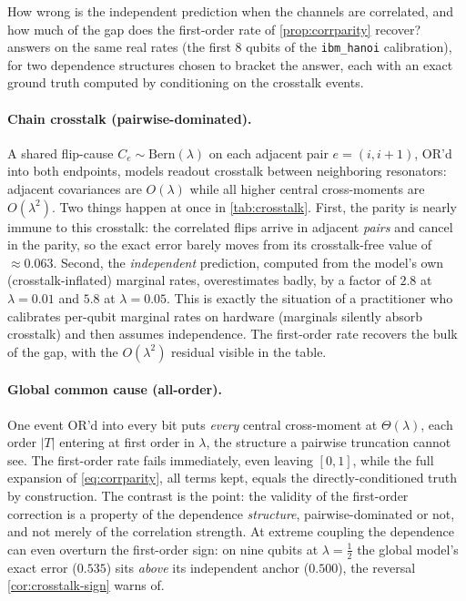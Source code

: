 \documentclass[11pt]{article}
\numberwithin{equation}{section}
\theoremstyle{plain}
\theoremstyle{definition}
\theoremstyle{remark}
\begin{document}
How wrong is the independent prediction when the channels are correlated, and
how much of the gap does the first-order rate of \cref{prop:corrparity}
recover?  answers on the same real rates (the first $8$
qubits of the \texttt{ibm\_hanoi} calibration), for two dependence structures
chosen to bracket the answer, each with an exact ground truth computed by
conditioning on the crosstalk events.

\paragraph{Chain crosstalk (pairwise-dominated).} A shared flip-cause
$C_e\sim\mathrm{Bern}(\lambda)$ on each adjacent pair $e=(i,i+1)$, OR'd into
both endpoints, models readout crosstalk between neighboring resonators:
adjacent covariances are $O(\lambda)$ while all higher central cross-moments
are $O(\lambda^2)$. Two things happen at once in \cref{tab:crosstalk}. First,
the parity is nearly immune to this crosstalk: the correlated flips arrive in
adjacent \emph{pairs} and cancel in the parity, so the exact error barely moves
from its crosstalk-free value of $\approx0.063$. Second, the \emph{independent}
prediction, computed from the model's own (crosstalk-inflated) marginal rates,
overestimates badly, by a factor of $2.8$ at $\lambda=0.01$ and $5.8$ at
$\lambda=0.05$. This is exactly the situation of a practitioner who calibrates
per-qubit marginal rates on hardware (marginals silently absorb crosstalk) and
then assumes independence. The first-order rate recovers the bulk of the gap,
with the $O(\lambda^2)$ residual visible in the table.

\paragraph{Global common cause (all-order).} One event OR'd into every bit
puts \emph{every} central cross-moment at $\Theta(\lambda)$, each order $|T|$
entering at first order in $\lambda$, the structure a pairwise truncation
cannot see.
The first-order rate fails immediately, even leaving $[0,1]$, while the full
expansion of \cref{eq:corrparity}, all terms kept, equals the
directly-conditioned truth by construction. The contrast is the point: the
validity of the first-order correction is a property of the dependence
\emph{structure}, pairwise-dominated or not, and not merely of the correlation
strength. At extreme coupling the dependence can even overturn the first-order
sign: on nine qubits at $\lambda=\tfrac12$ the global model's exact error
($0.535$) sits \emph{above} its independent anchor ($0.500$), the reversal
\cref{cor:crosstalk-sign} warns of.
\end{document}
